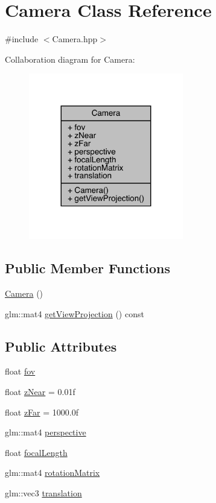 \hypertarget{class_camera}{}\section{Camera Class Reference}
\label{class_camera}


{\ttfamily \#include $<$Camera.\+hpp$>$}



Collaboration diagram for Camera\+:\nopagebreak
\begin{figure}[H]
\begin{center}
\leavevmode
\includegraphics[width=191pt]{class_camera__coll__graph}
\end{center}
\end{figure}
\subsection*{Public Member Functions}
\begin{DoxyCompactItemize}
\item 
\hyperlink{class_camera_a01f94c3543f56ede7af49dc778f19331}{Camera} ()
\item 
glm\+::mat4 \hyperlink{class_camera_a95833a5b98d52d4be7b7267c8c8490fe}{get\+View\+Projection} () const 
\end{DoxyCompactItemize}
\subsection*{Public Attributes}
\begin{DoxyCompactItemize}
\item 
float \hyperlink{class_camera_aff7393c9cfbccd7e369091f00008da93}{fov}
\item 
float \hyperlink{class_camera_a1db2166635ff27594eda3a23130b66ac}{z\+Near} = 0.\+01f
\item 
float \hyperlink{class_camera_a6290469f972a5903c805725db563f41f}{z\+Far} = 1000.\+0f
\item 
glm\+::mat4 \hyperlink{class_camera_ac4c1ee3074b5e4b70efec7d3ceb1467f}{perspective}
\item 
float \hyperlink{class_camera_a0375653f2ef532ac566eba093c2c922d}{focal\+Length}
\item 
glm\+::mat4 \hyperlink{class_camera_a0986d4d426737e26178056e3635dc3d8}{rotation\+Matrix}
\item 
glm\+::vec3 \hyperlink{class_camera_ab7dbba19077d1457c557c31a215c2557}{translation}
\end{DoxyCompactItemize}


